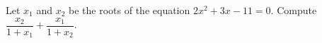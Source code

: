 Let $x_{1}$ and $x_{2}$ be the roots of the equation $2x^{2}+3x-11=0$. Compute $\dfrac{x_{2}}{1+x_{1}}+\dfrac{x_{1}}{1+x_{2}}$.
